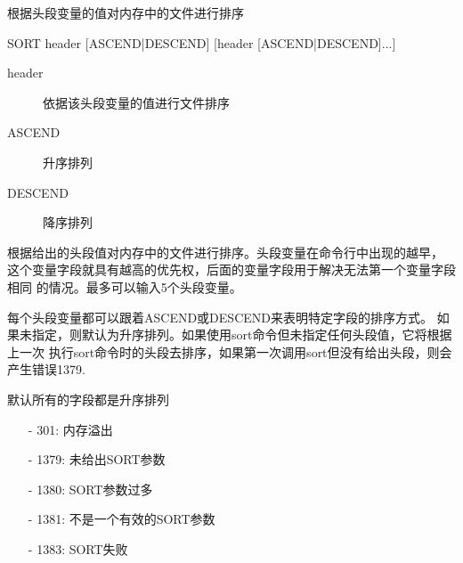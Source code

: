 \label{cmd:sort}

根据头段变量的值对内存中的文件进行排序

\begin{SACSTX}
SORT header [ASCEND|DESCEND] [header [ASCEND|DESCEND]...]
\end{SACSTX}

\begin{description}
\item [header] 依据该头段变量的值进行文件排序
\item [ASCEND] 升序排列
\item [DESCEND] 降序排列
\end{description}

根据给出的头段值对内存中的文件进行排序。头段变量在命令行中出现的越早，
这个变量字段就具有越高的优先权，后面的变量字段用于解决无法第一个变量字段相同
的情况。最多可以输入5个头段变量。

每个头段变量都可以跟着ASCEND或DESCEND来表明特定字段的排序方式。
如果未指定，则默认为升序排列。如果使用sort命令但未指定任何头段值，它将根据上一次
执行sort命令时的头段去排序，如果第一次调用sort但没有给出头段，则会产生错误1379.

默认所有的字段都是升序排列

\begin{itemize}
\item[-]301:  内存溢出
\item[-]1379: 未给出SORT参数
\item[-]1380: SORT参数过多
\item[-]1381: 不是一个有效的SORT参数
\item[-]1383: SORT失败
\end{itemize}
